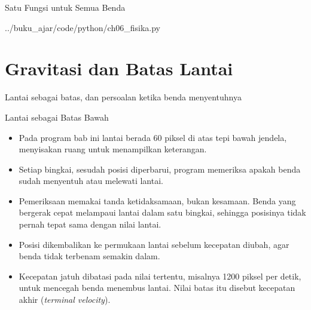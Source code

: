 \documentclass[aspectratio=169,10pt]{beamer}
\begin{document}
\begin{frame}[fragile]{Satu Fungsi untuk Semua Benda}

  {../buku_ajar/code/python/ch06_fisika.py}
\end{frame}

\section{Gravitasi dan Batas Lantai}
  {Lantai sebagai batas, dan persoalan ketika benda menyentuhnya}

\begin{frame}{Lantai sebagai Batas Bawah}
\begin{itemize}
  \item Pada program bab ini lantai berada 60 piksel di atas tepi bawah jendela,
        menyisakan ruang untuk menampilkan keterangan.
  \item Setiap bingkai, sesudah posisi diperbarui, program memeriksa apakah
        benda sudah menyentuh atau melewati lantai.
  \item Pemeriksaan memakai tanda ketidaksamaan, bukan kesamaan. Benda yang
        bergerak cepat melampaui lantai dalam satu bingkai, sehingga posisinya
        tidak pernah tepat sama dengan nilai lantai.
  \item Posisi dikembalikan ke permukaan lantai sebelum kecepatan diubah, agar
        benda tidak terbenam semakin dalam.
  \item Kecepatan jatuh dibatasi pada nilai tertentu, misalnya 1200 piksel per
        detik, untuk mencegah benda menembus lantai. Nilai batas itu disebut
        kecepatan akhir (\emph{terminal velocity}).
\end{itemize}
\end{frame}
\end{document}

